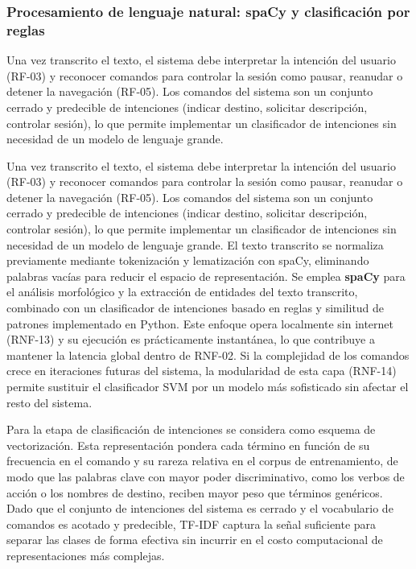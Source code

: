 \subsubsection{Procesamiento de lenguaje natural: spaCy y clasificación por reglas}

Una vez transcrito el texto, el sistema debe interpretar la intención del usuario (RF-03) y reconocer comandos para controlar la sesión como pausar, reanudar o detener la navegación (RF-05). Los comandos del sistema son un conjunto cerrado y predecible de intenciones (indicar destino, solicitar descripción, controlar sesión), lo que permite implementar un clasificador de intenciones sin necesidad de un modelo de lenguaje grande.

Una vez transcrito el texto, el sistema debe interpretar la intención del usuario (RF-03) y reconocer comandos para controlar la sesión como pausar, reanudar o detener la navegación (RF-05). Los comandos del sistema son un conjunto cerrado y predecible de intenciones (indicar destino, solicitar descripción, controlar sesión), lo que permite implementar un clasificador de intenciones sin necesidad de un modelo de lenguaje grande.
El texto transcrito se normaliza previamente mediante tokenización y lematización con spaCy, eliminando palabras vacías para reducir el espacio de representación. 
Se emplea \textbf{spaCy} para el análisis morfológico y la extracción de entidades del texto transcrito, combinado con un clasificador de intenciones basado en reglas y similitud de patrones implementado en Python. 
Este enfoque opera localmente sin internet (RNF-13) y su ejecución es prácticamente instantánea, lo que contribuye a mantener la latencia global dentro de RNF-02. Si la complejidad de los comandos crece en iteraciones futuras del sistema, la modularidad de esta capa (RNF-14) permite sustituir el clasificador SVM por un modelo más sofisticado sin afectar el resto del sistema.

Para la etapa de clasificación de intenciones se considera como esquema de vectorización. Esta representación pondera cada término en función de su frecuencia en el comando y su rareza relativa en el corpus de entrenamiento, de modo que las palabras clave con mayor poder discriminativo, como los verbos de acción o los nombres de destino, reciben mayor peso que términos genéricos. Dado que el conjunto de intenciones del sistema es cerrado y el vocabulario de comandos es acotado y predecible, TF-IDF captura la señal suficiente para separar las clases de forma efectiva sin incurrir en el costo computacional de representaciones más complejas.


